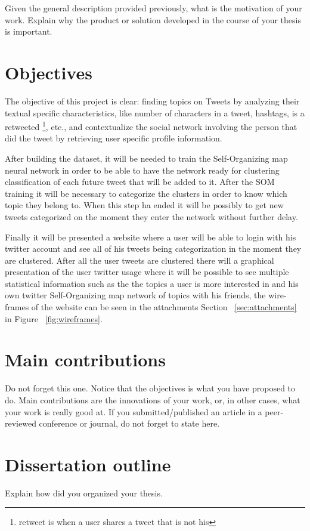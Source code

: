 Given the general description provided previously, what is the motivation of your work. Explain why the product or solution developed in the course of your thesis is important.

\section{Objectives}

The objective of this project is clear: finding topics on Tweets by analyzing their textual specific characteristics, like number of characters in a tweet, hashtags, is a retweeted \footnote{retweet is when a user shares a tweet that is not his}, etc., and contextualize the social network involving the person that did the tweet by retrieving user specific profile information.

After building the dataset, it will be needed to train the Self-Organizing map neural network in order to be able to have the network ready for clustering classification of each future tweet that will be added to it. After the SOM training it will be necessary to categorize the clusters in order to know which topic they belong to. When this step ha ended it will be possibly to get new tweets categorized on the moment they enter the network without further delay.

Finally it will be presented a website where a user will be able to login with his twitter account and see all of his tweets being categorization in the moment they are clustered. After all the user tweets are clustered there will a graphical presentation of the user twitter usage where it will be possible to see multiple statistical information such as the the topics a user is more interested in and his own twitter Self-Organizing map network of topics with his friends, the wire-frames of the website can be seen in the attachments Section ~\ref{sec:attachments} in Figure ~\ref{fig:wireframes}.
 

\section{Main contributions}
Do not forget this one. Notice that the objectives is what you have proposed to do. Main contributions are the innovations of your work, or, in other cases, what your work is really good at. If you submitted/published an article in a peer-reviewed conference or journal, do not forget to state here.

\section{Dissertation outline}
Explain how did you organized your thesis.

\cleardoublepage 
